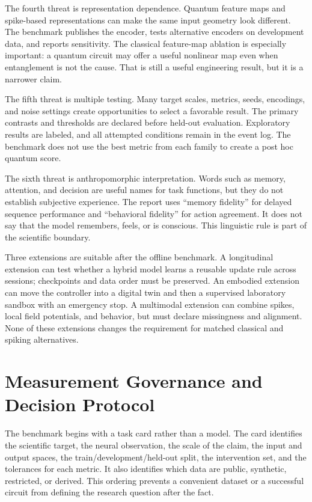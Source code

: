 \documentclass[conference]{IEEEtran}
\begin{document}
The fourth threat is representation dependence. Quantum feature maps and spike-based
representations can make the same input geometry look different. The benchmark publishes
the encoder, tests alternative encoders on development data, and reports sensitivity.
The classical feature-map ablation is especially important: a quantum circuit may offer
a useful nonlinear map even when entanglement is not the cause. That is still a useful
engineering result, but it is a narrower claim.

The fifth threat is multiple testing. Many target scales, metrics, seeds, encodings,
and noise settings create opportunities to select a favorable result. The primary
contrasts and thresholds are declared before held-out evaluation. Exploratory results
are labeled, and all attempted conditions remain in the event log. The benchmark does
not use the best metric from each family to create a post hoc quantum score.

The sixth threat is anthropomorphic interpretation. Words such as memory, attention,
and decision are useful names for task functions, but they do not establish subjective
experience. The report uses ``memory fidelity'' for delayed sequence performance and
``behavioral fidelity'' for action agreement. It does not say that the model remembers,
feels, or is conscious. This linguistic rule is part of the scientific boundary.

Three extensions are suitable after the offline benchmark. A longitudinal extension can
test whether a hybrid model learns a reusable update rule across sessions; checkpoints
and data order must be preserved. An embodied extension can move the controller into a
digital twin and then a supervised laboratory sandbox with an emergency stop. A
multimodal extension can combine spikes, local field potentials, and behavior, but must
declare missingness and alignment. None of these extensions changes the requirement for
matched classical and spiking alternatives.

\section{Measurement Governance and Decision Protocol}
\label{sec:governance}

The benchmark begins with a task card rather than a model. The card identifies the
scientific target, the neural observation, the scale of the claim, the input and output
spaces, the train/development/held-out split, the intervention set, and the tolerances
for each metric. It also identifies which data are public, synthetic, restricted, or
derived. This ordering prevents a convenient dataset or a successful circuit from
defining the research question after the fact.
\end{document}
